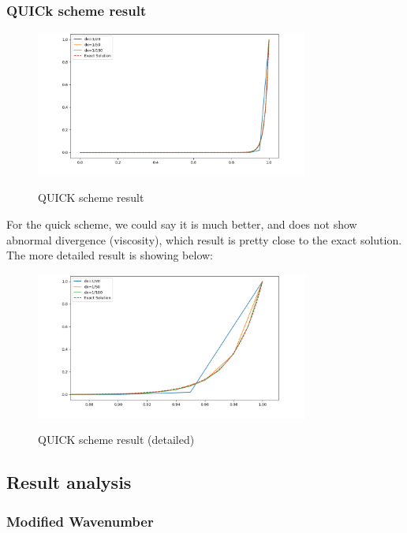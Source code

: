\documentclass[12pt]{article}
\begin{document}
\subsubsection{QUICk scheme result}
\begin{figure}[H]
    \centering
    \includegraphics[width=0.8\textwidth]{figures/P2Qt0.1.png}
    \label{IGs.jpg}
    \caption{QUICK scheme result}
\end{figure}

For the quick scheme, we could say it is much better, and 
does not show abnormal divergence (viscosity), which result 
is pretty close to the exact solution. The more detailed 
result is showing below:



\begin{figure}[H]
    \centering
    \includegraphics[width=0.8\textwidth]{figures/P2Qt0.1H.png}
    \label{IGs.jpg}
    \caption{QUICK scheme result (detailed)}
\end{figure}





\subsection{Result analysis}

\subsubsection{Modified Wavenumber}
\end{document}
